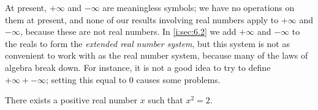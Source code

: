 \begin{rmk}\label{i:5.5.11}
  At present, \(+\infty\) and \(-\infty\) are meaningless symbols;
  we have no operations on them at present, and none of our results involving real numbers apply to \(+\infty\) and \(-\infty\), because these are not real numbers.
  In \cref{i:sec:6.2} we add \(+\infty\) and \(-\infty\) to the reals to form the \emph{extended real number system}, but this system is not as convenient to work with as the real number system, because many of the laws of algebra break down.
  For instance, it is not a good idea to try to define \(+\infty + -\infty\);
  setting this equal to \(0\) causes some problems.
\end{rmk}

\begin{prop}\label{i:5.5.12}
  There exists a positive real number \(x\) such that \(x^2 = 2\).
\end{prop}

